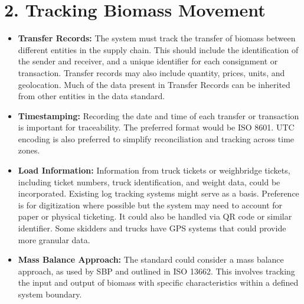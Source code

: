 \documentclass{article}
\begin{document}
\section*{2. Tracking Biomass Movement}
\begin{itemize}
    \item \textbf{Transfer Records:} The system must track the transfer of biomass between different entities in the supply chain. This should include the identification of the sender and receiver, and a unique identifier for each consignment or transaction. Transfer records may also include quantity, prices, units, and geolocation. Much of the data present in Transfer Records can be inherited from other entities in the data standard. 
    \item \textbf{Timestamping:} Recording the date and time of each transfer or transaction is important for traceability. The preferred format would be ISO 8601. UTC encoding is also preferred to simplify reconciliation and tracking across time zones. 
    \item \textbf{Load Information:} Information from truck tickets or weighbridge tickets, including ticket numbers, truck identification, and weight data, could be incorporated. Existing log tracking systems might serve as a basis. Preference is for digitization where possible but the system may need to account for paper or physical ticketing. It could also be handled via QR code or similar identifier. Some skidders and trucks have GPS systems that could provide more granular data. 
    \item \textbf{Mass Balance Approach:} The standard could consider a mass balance approach, as used by SBP and outlined in ISO 13662. This involves tracking the input and output of biomass with specific characteristics within a defined system boundary.
\end{itemize}
\end{document}

